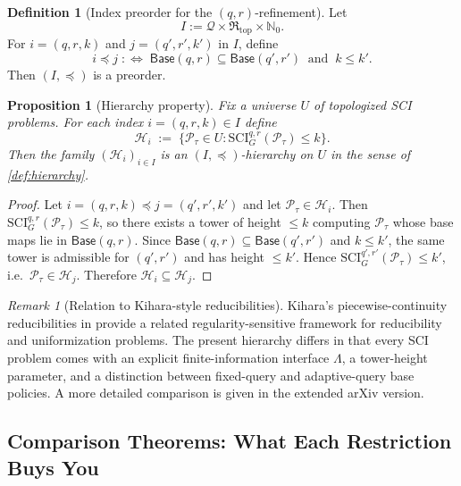 \documentclass{lmcs} %
\theoremstyle{plain}
\theoremstyle{plain}
\newtheorem{proposition}[theorem]{Proposition}
\theoremstyle{definition}
\newtheorem{definition}[theorem]{Definition}
\theoremstyle{remark}
\newtheorem{remark}[theorem]{Remark}
\theoremstyle{definition}
\theoremstyle{remark}
\numberwithin{equation}{section}
\begin{document}
\begin{definition}[Index preorder for the $(q,r)$-refinement]\label{def:QRK-preorder}
Let
\[
I := \mathcal Q \times \mathfrak{R}_{\mathrm{top}} \times \mathbb N_0.
\]
For $i=(q,r,k)$ and $j=(q',r',k')$ in $I$, define
\[
i\preceq j
\;:\Longleftrightarrow\;
\mathsf{Base}(q,r)\subseteq \mathsf{Base}(q',r')
\ \text{ and }\ k\le k'.
\]
Then $(I,\preceq)$ is a preorder.
\end{definition}

\begin{proposition}[Hierarchy property]\label{prop:QRK-hierarchy}
Fix a universe $U$ of topologized SCI problems.
For each index $i=(q,r,k)\in I$ define
\[
\mathcal{H}_i
\;:=\;
\bigl\{\mathcal{P}_\tau\in U : \mathrm{SCI}^{q,r}_G(\mathcal{P}_\tau)\le k\bigr\}.
\]
Then the family $(\mathcal{H}_i)_{i\in I}$ is an $(I,\preceq)$-hierarchy on $U$ in the sense of
\cref{def:hierarchy}.
\end{proposition}

\begin{proof}
Let $i=(q,r,k)\preceq j=(q',r',k')$ and let $\mathcal{P}_\tau\in\mathcal{H}_i$.
Then $\mathrm{SCI}^{q,r}_G(\mathcal{P}_\tau)\le k$, so there exists a tower of height $\le k$
computing $\mathcal{P}_\tau$ whose base maps lie in $\mathsf{Base}(q,r)$.
Since $\mathsf{Base}(q,r)\subseteq \mathsf{Base}(q',r')$ and $k\le k'$,
the same tower is admissible for $(q',r')$ and has height $\le k'$.
Hence $\mathrm{SCI}^{q',r'}_G(\mathcal{P}_\tau)\le k'$, i.e.\ $\mathcal{P}_\tau\in\mathcal{H}_j$.
Therefore $\mathcal{H}_i\subseteq \mathcal{H}_j$.
\end{proof}

\begin{remark}[Relation to Kihara-style reducibilities]
Kihara's piecewise-continuity reducibilities in \cite{kihara2017borel} provide a related regularity-sensitive
framework for reducibility and uniformization problems. The present hierarchy differs
in that every SCI problem comes with an explicit finite-information interface
\(\Lambda\), a tower-height parameter, and a distinction between fixed-query and
adaptive-query base policies. A more detailed comparison is given in the extended
arXiv version.
\end{remark}

\subsection{Comparison Theorems: What Each Restriction Buys You}
\end{document}
